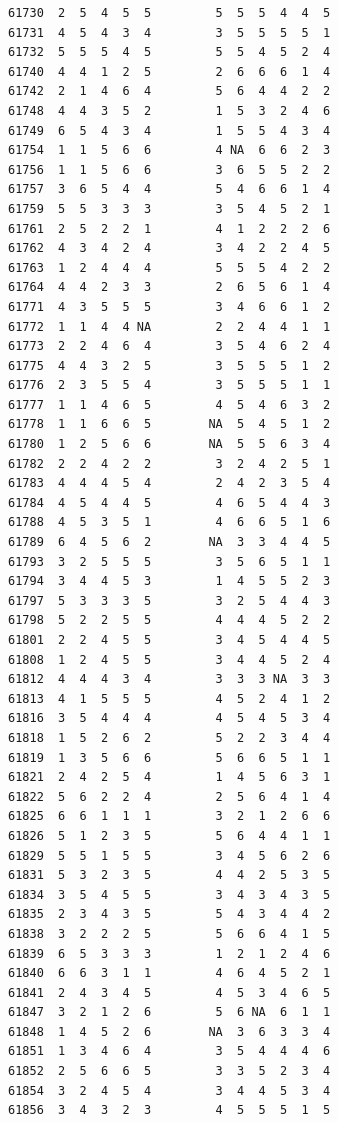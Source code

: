 \documentclass[
  letterpaper,
  DIV=11,
  numbers=noendperiod]{scrreprt}
\begin{document}
\begin{verbatim}
61730  2  5  4  5  5         5  5  5  4  4  5
61731  4  5  4  3  4         3  5  5  5  5  1
61732  5  5  5  4  5         5  5  4  5  2  4
61740  4  4  1  2  5         2  6  6  6  1  4
61742  2  1  4  6  4         5  6  4  4  2  2
61748  4  4  3  5  2         1  5  3  2  4  6
61749  6  5  4  3  4         1  5  5  4  3  4
61754  1  1  5  6  6         4 NA  6  6  2  3
61756  1  1  5  6  6         3  6  5  5  2  2
61757  3  6  5  4  4         5  4  6  6  1  4
61759  5  5  3  3  3         3  5  4  5  2  1
61761  2  5  2  2  1         4  1  2  2  2  6
61762  4  3  4  2  4         3  4  2  2  4  5
61763  1  2  4  4  4         5  5  5  4  2  2
61764  4  4  2  3  3         2  6  5  6  1  4
61771  4  3  5  5  5         3  4  6  6  1  2
61772  1  1  4  4 NA         2  2  4  4  1  1
61773  2  2  4  6  4         3  5  4  6  2  4
61775  4  4  3  2  5         3  5  5  5  1  2
61776  2  3  5  5  4         3  5  5  5  1  1
61777  1  1  4  6  5         4  5  4  6  3  2
61778  1  1  6  6  5        NA  5  4  5  1  2
61780  1  2  5  6  6        NA  5  5  6  3  4
61782  2  2  4  2  2         3  2  4  2  5  1
61783  4  4  4  5  4         2  4  2  3  5  4
61784  4  5  4  4  5         4  6  5  4  4  3
61788  4  5  3  5  1         4  6  6  5  1  6
61789  6  4  5  6  2        NA  3  3  4  4  5
61793  3  2  5  5  5         3  5  6  5  1  1
61794  3  4  4  5  3         1  4  5  5  2  3
61797  5  3  3  3  5         3  2  5  4  4  3
61798  5  2  2  5  5         4  4  4  5  2  2
61801  2  2  4  5  5         3  4  5  4  4  5
61808  1  2  4  5  5         3  4  4  5  2  4
61812  4  4  4  3  4         3  3  3 NA  3  3
61813  4  1  5  5  5         4  5  2  4  1  2
61816  3  5  4  4  4         4  5  4  5  3  4
61818  1  5  2  6  2         5  2  2  3  4  4
61819  1  3  5  6  6         5  6  6  5  1  1
61821  2  4  2  5  4         1  4  5  6  3  1
61822  5  6  2  2  4         2  5  6  4  1  4
61825  6  6  1  1  1         3  2  1  2  6  6
61826  5  1  2  3  5         5  6  4  4  1  1
61829  5  5  1  5  5         3  4  5  6  2  6
61831  5  3  2  3  5         4  4  2  5  3  5
61834  3  5  4  5  5         3  4  3  4  3  5
61835  2  3  4  3  5         5  4  3  4  4  2
61838  3  2  2  2  5         5  6  6  4  1  5
61839  6  5  3  3  3         1  2  1  2  4  6
61840  6  6  3  1  1         4  6  4  5  2  1
61841  2  4  3  4  5         4  5  3  4  6  5
61847  3  2  1  2  6         5  6 NA  6  1  1
61848  1  4  5  2  6        NA  3  6  3  3  4
61851  1  3  4  6  4         3  5  4  4  4  6
61852  2  5  6  6  5         3  3  5  2  3  4
61854  3  2  4  5  4         3  4  4  5  3  4
61856  3  4  3  2  3         4  5  5  5  1  5

\end{verbatim}
\end{document}
